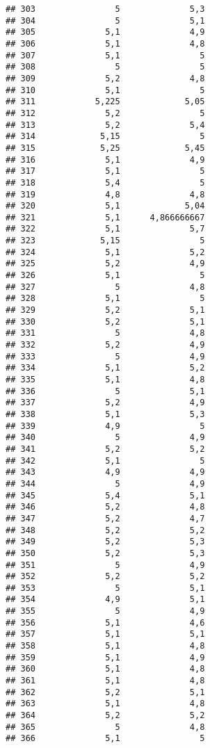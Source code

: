 \documentclass[
]{article}
\begin{document}
\begin{verbatim}
## 303                5              5,3
## 304                5              5,1
## 305              5,1              4,9
## 306              5,1              4,8
## 307              5,1                5
## 308                5                5
## 309              5,2              4,8
## 310              5,1                5
## 311            5,225             5,05
## 312              5,2                5
## 313              5,2              5,4
## 314             5,15                5
## 315             5,25             5,45
## 316              5,1              4,9
## 317              5,1                5
## 318              5,4                5
## 319              4,8              4,8
## 320              5,1             5,04
## 321              5,1      4,866666667
## 322              5,1              5,7
## 323             5,15                5
## 324              5,1              5,2
## 325              5,2              4,9
## 326              5,1                5
## 327                5              4,8
## 328              5,1                5
## 329              5,2              5,1
## 330              5,2              5,1
## 331                5              4,8
## 332              5,2              4,9
## 333                5              4,9
## 334              5,1              5,2
## 335              5,1              4,8
## 336                5              5,1
## 337              5,2              4,9
## 338              5,1              5,3
## 339              4,9                5
## 340                5              4,9
## 341              5,2              5,2
## 342              5,1                5
## 343              4,9              4,9
## 344                5              4,9
## 345              5,4              5,1
## 346              5,2              4,8
## 347              5,2              4,7
## 348              5,2              5,2
## 349              5,2              5,3
## 350              5,2              5,3
## 351                5              4,9
## 352              5,2              5,2
## 353                5              5,1
## 354              4,9              5,1
## 355                5              4,9
## 356              5,1              4,6
## 357              5,1              5,1
## 358              5,1              4,8
## 359              5,1              4,9
## 360              5,1              4,8
## 361              5,1              4,8
## 362              5,2              5,1
## 363              5,1              4,8
## 364              5,2              5,2
## 365                5              4,8
## 366              5,1                5

\end{verbatim}
\end{document}
